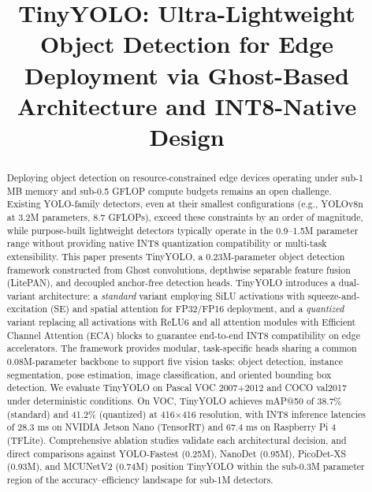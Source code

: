 \documentclass[conference]{IEEEtran}
\begin{document}
\title{TinyYOLO: Ultra-Lightweight Object Detection for Edge Deployment via Ghost-Based Architecture and INT8-Native Design}

\author{
}

\maketitle

\begin{abstract}
Deploying object detection on resource-constrained edge devices operating under sub-1 MB memory and sub-0.5 GFLOP compute budgets remains an open challenge. Existing YOLO-family detectors, even at their smallest configurations (e.g., YOLOv8n at 3.2M parameters, 8.7 GFLOPs), exceed these constraints by an order of magnitude, while purpose-built lightweight detectors typically operate in the 0.9--1.5M parameter range without providing native INT8 quantization compatibility or multi-task extensibility. This paper presents TinyYOLO, a 0.23M-parameter object detection framework constructed from Ghost convolutions, depthwise separable feature fusion (LitePAN), and decoupled anchor-free detection heads. TinyYOLO introduces a dual-variant architecture: a \textit{standard} variant employing SiLU activations with squeeze-and-excitation (SE) and spatial attention for FP32/FP16 deployment, and a \textit{quantized} variant replacing all activations with ReLU6 and all attention modules with Efficient Channel Attention (ECA) blocks to guarantee end-to-end INT8 compatibility on edge accelerators. The framework provides modular, task-specific heads sharing a common 0.08M-parameter backbone to support five vision tasks: object detection, instance segmentation, pose estimation, image classification, and oriented bounding box detection. We evaluate TinyYOLO on Pascal VOC 2007+2012 and COCO val2017 under deterministic conditions. On VOC, TinyYOLO achieves mAP@50 of 38.7\% (standard) and 41.2\% (quantized) at 416$\times$416 resolution, with INT8 inference latencies of 28.3 ms on NVIDIA Jetson Nano (TensorRT) and 67.4 ms on Raspberry Pi 4 (TFLite). Comprehensive ablation studies validate each architectural decision, and direct comparisons against YOLO-Fastest (0.25M), NanoDet (0.95M), PicoDet-XS (0.93M), and MCUNetV2 (0.74M) position TinyYOLO within the sub-0.3M parameter region of the accuracy--efficiency landscape for sub-1M detectors.
\end{abstract}
\end{document}
